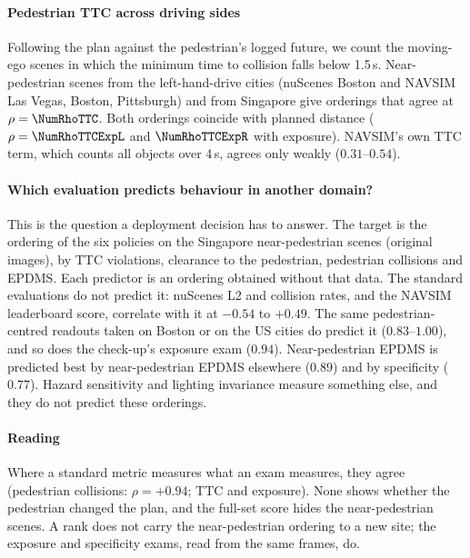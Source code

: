 \paragraph{Pedestrian TTC across driving sides}
Following the plan against the pedestrian's logged future, we count the moving-ego scenes in which the
minimum time to collision falls below 1.5\,s. Near-pedestrian scenes from the left-hand-drive cities
(nuScenes Boston and NAVSIM Las Vegas, Boston, Pittsburgh) and from Singapore give orderings that agree
at $\rho=\NumRhoTTC$. Both orderings coincide with planned distance ($\rho=\NumRhoTTCExpL$ and $\NumRhoTTCExpR$ with exposure).
NAVSIM's own TTC term, which counts all objects over 4\,s, agrees only weakly ($0.31$--$0.54$).

\paragraph{Which evaluation predicts behaviour in another domain?}
This is the question a deployment decision has to answer. The target is the ordering of the six policies on the Singapore near-pedestrian scenes (original images),
by TTC violations, clearance to the pedestrian, pedestrian collisions and EPDMS. Each predictor is an
ordering obtained without that data. The standard evaluations do not predict it: nuScenes L2 and
collision rates, and the NAVSIM leaderboard score, correlate with it at $-0.54$ to $+0.49$. The same
pedestrian-centred readouts taken on Boston or on the US cities do predict it ($0.83$--$1.00$), and so
does the check-up's exposure exam ($0.94$). Near-pedestrian EPDMS is predicted best by near-pedestrian
EPDMS elsewhere ($0.89$) and by specificity ($0.77$). Hazard sensitivity and lighting invariance measure
something else, and they do not predict these orderings.

\paragraph{Reading}
Where a standard metric measures what an exam measures, they agree (pedestrian collisions: $\rho=+0.94$;
TTC and exposure). None shows whether the pedestrian changed the plan, and the full-set score hides the near-pedestrian scenes. A rank does not carry the near-pedestrian ordering to a new site; the exposure and specificity exams, read from the same frames, do.
